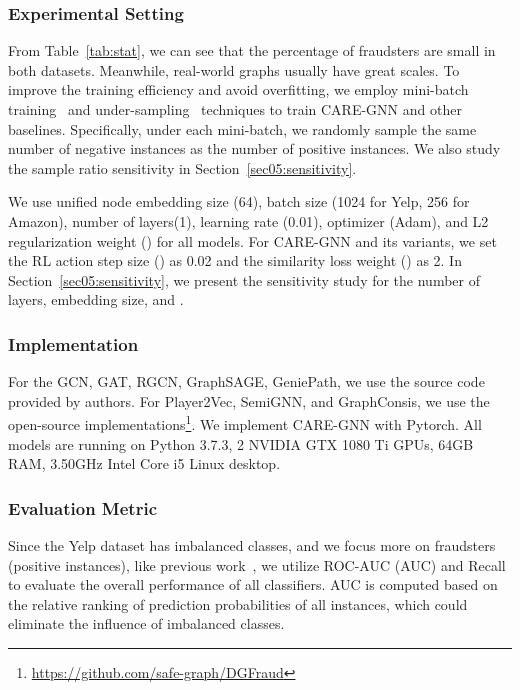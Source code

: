 \subsubsection{Experimental Setting}
\label{sec05:experimental_setting}
From Table~\ref{tab:stat}, we can see that the percentage of fraudsters are small in both datasets.
Meanwhile, real-world graphs usually have great scales.
To improve the training efficiency and avoid overfitting, we employ mini-batch training~\cite{goyal2017accurate} and under-sampling~\cite{liu2008exploratory} techniques to train CARE-GNN and other baselines.
Specifically, under each mini-batch, we randomly sample the same number of negative instances as the number of positive instances.
We also study the sample ratio sensitivity in Section~\ref{sec05:sensitivity}.

We use unified node embedding size (64), batch size (1024 for Yelp, 256 for Amazon), number of layers(1), learning rate (0.01), optimizer (Adam), and L2 regularization weight () for all models.
For CARE-GNN and its variants, we set the RL action step size () as 0.02 and the similarity loss weight () as 2.
In Section~\ref{sec05:sensitivity}, we present the sensitivity study for the number of layers, embedding size, and .   

\subsubsection{Implementation}
For the GCN, GAT, RGCN, GraphSAGE, GeniePath, we use the source code provided by authors.
For Player2Vec, SemiGNN, and GraphConsis, we use the open-source implementations\footnote{\url{https://github.com/safe-graph/DGFraud}}.
We implement CARE-GNN with Pytorch. All models are running on Python 3.7.3, 2 NVIDIA GTX 1080 Ti GPUs, 64GB RAM, 3.50GHz Intel Core i5 Linux desktop.

\subsubsection{Evaluation Metric}
Since the Yelp dataset has imbalanced classes, and we focus more on fraudsters (positive instances),
like previous work~\cite{Rayana2015}, we utilize ROC-AUC (AUC) and Recall to evaluate the overall performance of all classifiers.
AUC is computed based on the relative ranking of prediction probabilities of all instances, which could eliminate the influence of imbalanced classes.


